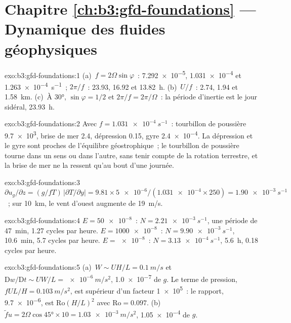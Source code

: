\section*{Chapitre \ref{ch:b3:gfd-foundations} --- Dynamique des fluides géophysiques}

\begin{solution}{exo:b3:gfd-foundations:1}
(a)~$f = 2\Omega\sin\varphi$~: \num{7.292e-5}, \num{1.031e-4} et
\qty{1.263e-4}{s^{-1}}~; $2\pi/f$~: 23.93, 16.92 et \qty{13.82}{h}.
(b)~$U/f$~: 2.74, 1.94 et \qty{1.58}{km}. (c)~À \ang{30}, $\sin\varphi =
1/2$ et $2\pi/f = 2\pi/\Omega$~: la période d'inertie est le jour sidéral,
\qty{23.93}{h}.
\end{solution}

\begin{solution}{exo:b3:gfd-foundations:2}
Avec $f = \qty{1.031e-4}{s^{-1}}$~: tourbillon de poussière \num{9.7e3}, brise de mer 2.4,
dépression 0.15, gyre \num{2.4e-4}. La dépression et le gyre sont proches de
l'équilibre géostrophique~; le tourbillon de poussière tourne dans un sens ou dans l'autre, sans tenir compte de la
rotation terrestre, et la brise de mer ne la ressent qu'au bout d'une journée.
\end{solution}

\begin{solution}{exo:b3:gfd-foundations:3}
$\partial u_g/\partial z = (g/fT)\,|\partial T/\partial y| = 9.81\times
\num{5e-6}/(\num{1.031e-4}\times250) = \qty{1.90e-3}{s^{-1}}$~; sur
\qty{10}{km}, le vent d'ouest augmente de \qty{19}{m/s}.
\end{solution}

\begin{solution}{exo:b3:gfd-foundations:4}
$E = \num{50e-8}$~: $N = \qty{2.21e-3}{s^{-1}}$, une période de \qty{47}{min},
\num{1.27} cycles par heure. $E = \num{1000e-8}$~: $N = \qty{9.90e-3}{s^{-1}}$,
\qty{10.6}{min}, 5.7 cycles par heure. $E = \num{e-8}$~: $N =
\qty{3.13e-4}{s^{-1}}$, \qty{5.6}{h}, 0.18 cycles par heure.
\end{solution}

\begin{solution}{exo:b3:gfd-foundations:5}
(a)~$W \sim UH/L = \qty{0.1}{m/s}$ et $\mathrm Dw/\mathrm Dt \sim UW/L =
\qty{e-6}{m/s^2}$, \num{1.0e-7} de $g$. Le terme de pression, $fUL/H =
\qty{0.103}{m/s^2}$, est supérieur d'un facteur \num{1e5}~: le rapport, \num{9.7e-6}, est
$\mathrm{Ro}(H/L)^2$ avec $\mathrm{Ro} = 0.097$. (b)~$\tilde fu =
2\Omega\cos\ang{45}\times10 = \qty{1.03e-3}{m/s^2}$, \num{1.05e-4} de $g$.
\end{solution}

